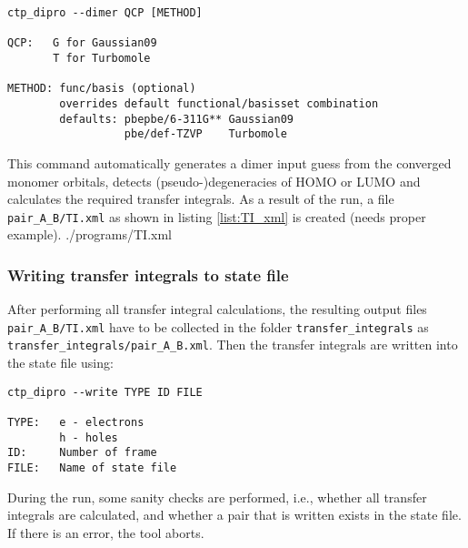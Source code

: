  \begin{verbatim}
ctp_dipro --dimer QCP [METHOD]

QCP:   G for Gaussian09
       T for Turbomole

METHOD: func/basis (optional)
        overrides default functional/basisset combination
        defaults: pbepbe/6-311G** Gaussian09
                  pbe/def-TZVP    Turbomole
\end{verbatim}
This command automatically generates a dimer input guess from the converged monomer orbitals, detects (pseudo-)degeneracies of HOMO or LUMO and calculates the required transfer integrals. As a result of the run, a file {\tt pair\_A\_B/TI.xml} as shown in listing \ref{list:TI_xml} is created (needs proper example).
 {./programs/TI.xml}

\subsubsection{Writing transfer integrals to state file}
After performing all transfer integral calculations, the resulting output files {\tt pair\_A\_B/TI.xml} have to be collected in the folder {\tt transfer\_integrals} as {\tt transfer\_integrals/pair\_A\_B.xml}. Then the transfer integrals are written into the state file using:
\begin{verbatim}
ctp_dipro --write TYPE ID FILE

TYPE:   e - electrons
        h - holes
ID:     Number of frame
FILE:   Name of state file 
\end{verbatim}
During the run, some sanity checks are performed, i.e., whether all transfer integrals are calculated, and whether a pair that is written exists in the state file. If there is an error, the tool aborts.
